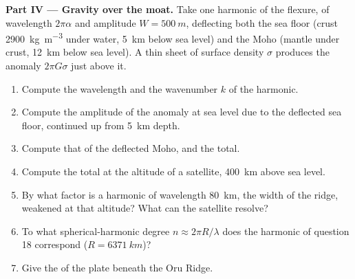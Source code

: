\begin{problem}
\noindent\textbf{Part IV --- Gravity over the moat.} Take one harmonic of the
flexure, of wavelength $2\pi\alpha$ and amplitude $W = \qty{500}{m}$, deflecting
both the sea floor (crust \qty{2900}{kg.m^{-3}} under water, \qty{5}{km} below
sea level) and the Moho (mantle under crust, \qty{12}{km} below sea level). A
thin sheet of surface density $\sigma$ produces the anomaly $2\pi G\sigma$
just above it.
\begin{enumerate}[resume]
  \item Compute the wavelength and the wavenumber $k$ of the harmonic.
  \item Compute the amplitude of the anomaly at sea level due to the deflected
        sea floor, continued up from \qty{5}{km} depth.
  \item Compute that of the deflected Moho, and the total.
  \item Compute the total at the altitude of a satellite, \qty{400}{km} above sea
        level.
  \item By what factor is a harmonic of wavelength \qty{80}{km}, the width of
        the ridge, weakened at that altitude? What can the satellite resolve?
  \item To what spherical-harmonic degree $n \approx 2\pi R/\lambda$ does the
        harmonic of question 18 correspond ($R = \qty{6371}{km}$)?
  \item Give the  of the plate beneath the Oru
        Ridge.
\end{enumerate}
\end{problem}
